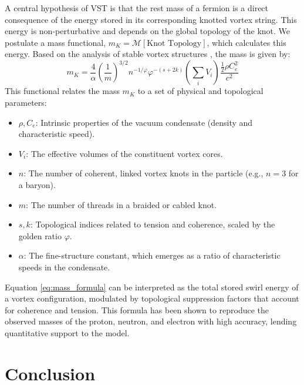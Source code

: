 \documentclass[12pt, a4paper]{article}
\begin{document}
    A central hypothesis of VST is that the rest mass of a fermion is a direct consequence of the energy stored in its corresponding knotted vortex string. This energy is non-perturbative and depends on the global topology of the knot. We postulate a mass functional, $m_K = \mathcal{M}[\text{Knot Topology}]$, which calculates this energy. Based on the analysis of stable vortex structures \cite{Faddeev1997}, the mass is given by:
    \begin{equation}
        m_K = \frac{4}{\alpha} \left(\frac{1}{m}\right)^{3/2} n^{-1/\varphi} \varphi^{-(s+2k)} \left(\sum_i V_i\right) \frac{\frac{1}{2}\rho C_e^2}{c^2}
        \label{eq:mass_formula}
    \end{equation}
    This functional relates the mass $m_K$ to a set of physical and topological parameters:
    \begin{itemize}
        \item $\rho, C_e$: Intrinsic properties of the vacuum condensate (density and characteristic speed).
        \item $V_i$: The effective volumes of the constituent vortex cores.
        \item $n$: The number of coherent, linked vortex knots in the particle (e.g., $n=3$ for a baryon).
        \item $m$: The number of threads in a braided or cabled knot.
        \item $s, k$: Topological indices related to tension and coherence, scaled by the golden ratio $\varphi$.
        \item $\alpha$: The fine-structure constant, which emerges as a ratio of characteristic speeds in the condensate.
    \end{itemize}
    Equation \ref{eq:mass_formula} can be interpreted as the total stored swirl energy of a vortex configuration, modulated by topological suppression factors that account for coherence and tension. This formula has been shown to reproduce the observed masses of the proton, neutron, and electron with high accuracy, lending quantitative support to the model.

    \section{Conclusion}
\end{document}
